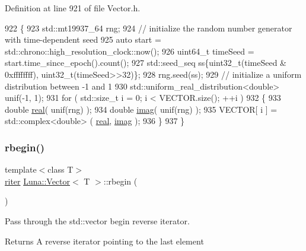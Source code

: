 Definition at line 921 of file Vector.\+h.


\begin{DoxyCode}
922   \{
923     std::mt19937\_64 rng;
924     \textcolor{comment}{// initialize the random number generator with time-dependent seed}
925     \textcolor{keyword}{auto} start = std::chrono::high\_resolution\_clock::now();
926     uint64\_t timeSeed = start.time\_since\_epoch().count();
927     std::seed\_seq ss\{uint32\_t(timeSeed & 0xffffffff), uint32\_t(timeSeed>>32)\};
928     rng.seed(ss);
929     \textcolor{comment}{// initialize a uniform distribution between -1 and 1}
930     std::uniform\_real\_distribution<double> unif(-1, 1);
931     \textcolor{keywordflow}{for} ( std::size\_t i = 0; i < VECTOR.size(); ++i )
932     \{
933       \textcolor{keywordtype}{double} \hyperlink{classLuna_1_1Vector_a39fa58d9f5fdca76b6ffa6cc481f9284}{real}( unif(rng) );
934       \textcolor{keywordtype}{double} \hyperlink{classLuna_1_1Vector_afde9791d85dd530a0e1c9794e8c6534e}{imag}( unif(rng) );
935       VECTOR[ i ] = std::complex<double> ( \hyperlink{classLuna_1_1Vector_a39fa58d9f5fdca76b6ffa6cc481f9284}{real}, \hyperlink{classLuna_1_1Vector_afde9791d85dd530a0e1c9794e8c6534e}{imag} );
936     \}
937   \}
\end{DoxyCode}
\mbox{\label{classLuna_1_1Vector_ac7d078c9f67745df2865f50577722926}} 
\subsubsection{\texorpdfstring{rbegin()}{rbegin()}\hspace{0.1cm}{\footnotesize\ttfamily [1/2]}}
{\footnotesize\ttfamily template$<$class T$>$ \\
\hyperlink{classLuna_1_1Vector_a6db6c6b09df2c68bbfd1960c56bb20d5}{riter} \hyperlink{classLuna_1_1Vector}{Luna\+::\+Vector}$<$ T $>$\+::rbegin (\begin{DoxyParamCaption}{ }\end{DoxyParamCaption})\hspace{0.3cm}{\ttfamily [inline]}}



Pass through the std\+::vector begin reverse iterator. 

\begin{DoxyReturn}{Returns}
A reverse iterator pointing to the last element 
\end{DoxyReturn}


